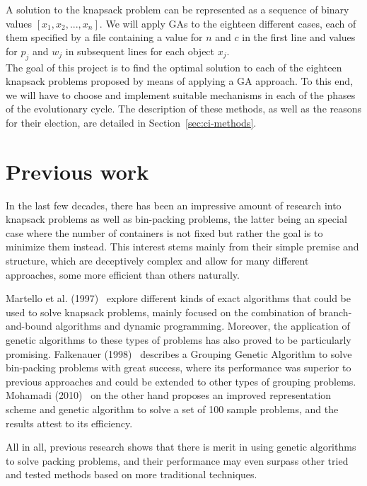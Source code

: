 \documentclass[anon]{CI}
\begin{document}
A solution to the knapsack problem can be represented as a sequence of binary values $[x_1, x_2, ..., x_n]$. We will apply GAs to the eighteen different cases, each of them specified by a file containing a value for $n$ and $c$ in the first line and values for $p_j$ and $w_j$ in subsequent lines for each object $x_j$. \\

The goal of this project is to find the optimal solution to each of the eighteen knapsack problems proposed by means of applying a GA approach. To this end, we will have to choose and implement suitable mechanisms in each of the phases of the evolutionary cycle. The description of these methods, as well as the reasons for their election, are detailed in Section~\ref{sec:ci-methods}.

\section{Previous work}

In the last few decades, there has been an impressive amount of research into knapsack problems as well as bin-packing problems, the latter being an special case where the number of containers is not fixed but rather the goal is to minimize them instead. This interest stems mainly from their simple premise and structure, which are deceptively complex and allow for many different approaches, some more efficient than others naturally.

Martello et al. (1997)~\cite{MARTELLO2000325} explore different kinds of exact algorithms that could be used to solve knapsack problems, mainly focused on the combination of branch-and-bound algorithms and dynamic programming. Moreover, the application of genetic algorithms to these types of problems has also proved to be particularly promising. Falkenauer (1998)~\cite{falkenauer1998} describes a Grouping Genetic Algorithm to solve bin-packing problems with great success, where its performance was superior to previous approaches and could be extended to other types of grouping problems. Mohamadi (2010)~\cite{mohamadi2010} on the other hand proposes an improved representation scheme and genetic algorithm to solve a set of 100 sample problems, and the results attest to its efficiency.

All in all, previous research shows that there is merit in using genetic algorithms to solve packing problems, and their performance may even surpass other tried and tested methods based on more traditional techniques.
\end{document}
